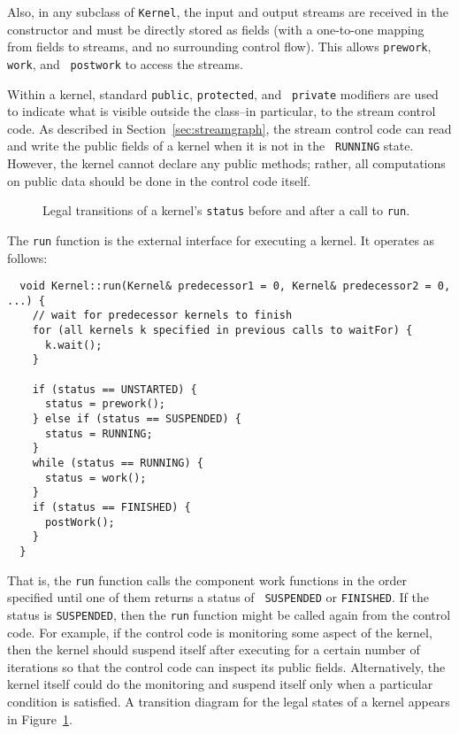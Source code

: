 Also, in any subclass of {\tt Kernel}, the input and output streams
are received in the constructor and must be directly stored as fields
(with a one-to-one mapping from fields to streams, and no surrounding
control flow).  This allows {\tt prework}, {\tt work}, and {\tt
postwork} to access the streams.

Within a kernel, standard {\tt public}, {\tt protected}, and {\tt
private} modifiers are used to indicate what is visible outside the
class--in particular, to the stream control code.  As described in
Section~\ref{sec:streamgraph}, the stream control code can read and
write the public fields of a kernel when it is not in the {\tt
RUNNING} state.  However, the kernel cannot declare any public
methods; rather, all computations on public data should be done in the
control code itself.


\begin{figure}[t]
\begin{center}
\end{center}
\vspace{-12pt}
\caption{Legal transitions of a kernel's {\tt status} before and after
a call to {\tt run}.\protect\label{fig:kernel-status}}
\end{figure}

The {\tt run} function is the external interface for executing a
kernel.  It operates as follows: 
{\small
\begin{verbatim}
  void Kernel::run(Kernel& predecessor1 = 0, Kernel& predecessor2 = 0, ...) {
    // wait for predecessor kernels to finish
    for (all kernels k specified in previous calls to waitFor) {
      k.wait();
    }

    if (status == UNSTARTED) {
      status = prework();
    } else if (status == SUSPENDED) {
      status = RUNNING;
    }
    while (status == RUNNING) {
      status = work();
    }
    if (status == FINISHED) {
      postWork();
    }
  } 
\end{verbatim}}
That is, the {\tt run} function calls the component work functions in
the order specified until one of them returns a status of {\tt
SUSPENDED} or {\tt FINISHED}.  If the status is {\tt SUSPENDED}, then
the {\tt run} function might be called again from the control code.
For example, if the control code is monitoring some aspect of the
kernel, then the kernel should suspend itself after executing for a
certain number of iterations so that the control code can inspect its
public fields.  Alternatively, the kernel itself could do the
monitoring and suspend itself only when a particular condition is
satisfied.  A transition diagram for the legal states of a kernel
appears in Figure~\ref{fig:kernel-status}.

